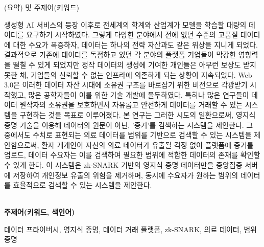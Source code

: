 
{\noindent {}(요약) 및 주제어(키워드) \par}
\vspace{1cm}
생성형 AI 서비스의 등장 이후로 전세계의 학계와 산업계가 모델을 학습할 대량의 데이터를 요구하기 시작하였다. 그렇게 다양한 분야에서 전에 없던 수준의 고품질 데이터에 대한 수요가 폭증하자, 데이터는 하나의 전략 자산과도 같은 위상을 지니게 되었다. 결과적으로 기존에 데이터를 독점하고 있던 각 분야의 플랫폼 기업들이 막강한 영향력을 떨칠 수 있게 되었지만 정작 데이터의 생성에 기여한 개인들은 아무런 보상도 받지 못한 채, 기업들의 신뢰할 수 없는 인프라에 의존하게 되는 상황이 지속되었다. Web 3.0은 이러한 데이터 자산 시대에 소유권 구조를 바로잡기 위한 비전으로 각광받기 시작했고, 많은 공학자들이 이를 위한 기술 개발에 몰두하였다. 특히나 많은 연구들이 데이터 원작자의 소유권을 보호하면서 자유롭고 안전하게 데이터를 거래할 수 있는 시스템을 구현하는 것을 목표로 이루어졌다. 본 연구는 그러한 시도의 일환으로써, 영지식 증명 기술을 이용해 데이터의 원문이 아닌, '증거'를 검색하는 시스템을 제안한다. 그 중에서도 수치로 표현되는 의료 데이터를 범위를 기반으로 검색할 수 있는 시스템을 제안함으로써, 환자 개개인이 자신의 의료 데이터가 유출될 걱정 없이 플랫폼에 증거를 업로드, 데이터 수요자는 이를 검색하여 필요한 범위에 적합한 데이터의 존재를 확인할 수 있게 한다. 이 시스템은 zk-SNARK 기반의 영지식 증명 데이터만을 중앙집중 서버에 저장하여 개인정보 유출의 위험을 제거하며, 동시에 수요자가 원하는 범위의 데이터를 효율적으로 검색할 수 있는 시스템을 제안한다. \\ \\

{\noindent \bfseries 주제어(키워드, 색인어) \par}
\noindent 데이터 프라이버시, 영지식 증명, 데이터 거래 플랫폼, zk-SNARK, 의료 데이터, 범위 증명

\clearpage